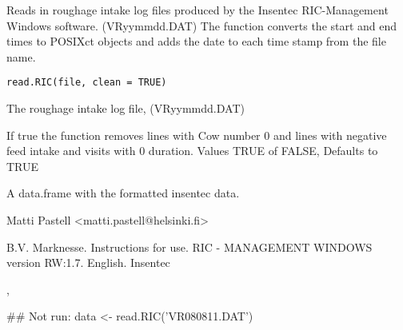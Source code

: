 \documentclass{book}
\begin{document}
\begin{Description}\relax
Reads in roughage intake log files produced by the Insentec
RIC-Management Windows software. (VRyymmdd.DAT) The function converts
the start and end times to POSIXct  objects and adds the date to each
time stamp from the file name.
\end{Description}
\begin{Usage}
\begin{verbatim}
read.RIC(file, clean = TRUE)
\end{verbatim}
\end{Usage}
\begin{Arguments}
\begin{ldescription}
\item[\code{file}] The roughage intake log file, (VRyymmdd.DAT)
\item[\code{clean}] If true the function removes lines with Cow number 0 and
lines with negative feed intake and visits with 0 duration.
Values TRUE of FALSE, Defaults to TRUE
\end{ldescription}
\end{Arguments}
\begin{Value}
A data.frame with the formatted insentec data.
\end{Value}
\begin{Author}\relax
Matti Pastell <matti.pastell@helsinki.fi>
\end{Author}
\begin{References}\relax
B.V. Marknesse. Instructions for use. RIC - MANAGEMENT WINDOWS version
RW:1.7. English. Insentec
\end{References}
\begin{SeeAlso}\relax
{}, 
\end{SeeAlso}
\begin{Examples}
\begin{ExampleCode}
## Not run: data <- read.RIC('VR080811.DAT')
\end{ExampleCode}
\end{Examples}
\end{document}
